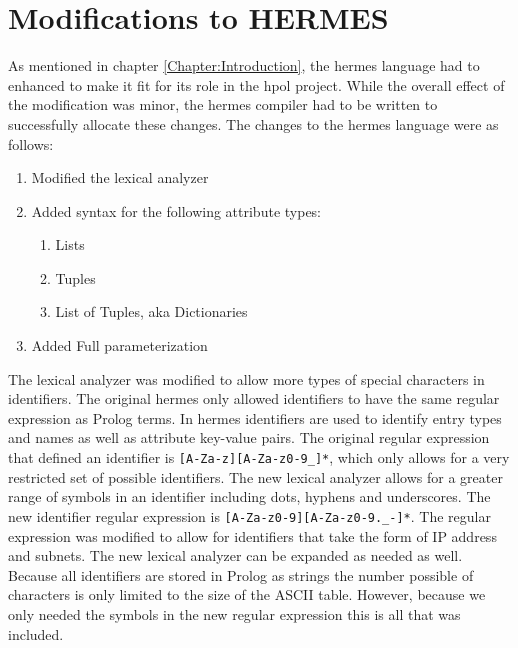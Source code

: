\documentclass[12pt,letterpaper]{report}
\begin{document}

\section{Modifications to HERMES}
As mentioned in chapter \ref{Chapter:Introduction}, the \ac{hermes} language had to enhanced to make it fit for its role in the \ac{hpol} project. While the overall effect of the modification was minor, the \ac{hermes} compiler had to be written to successfully allocate these changes. The changes to the \ac{hermes} language were as follows:
\begin{enumerate}
	\item Modified the lexical analyzer
	\item Added syntax for the following attribute types:
	\begin{enumerate}
		\item Lists
		\item Tuples
		\item List of Tuples, aka Dictionaries
	\end{enumerate}
	\item Added Full parameterization
\end{enumerate}

The lexical analyzer was modified to allow more types of special characters in identifiers. The original \ac{hermes} only allowed identifiers to have the same regular expression as Prolog terms. In \ac{hermes} identifiers are used to identify entry types and names as well as attribute key-value pairs. The original regular expression that defined an identifier is \verb|[A-Za-z][A-Za-z0-9_]*|, which only allows for a very restricted set of possible identifiers. The new lexical analyzer allows for a greater range of symbols in an identifier including dots, hyphens and underscores. The new identifier regular expression is \verb|[A-Za-z0-9][A-Za-z0-9._-]*|. The regular expression was modified to allow for identifiers that take the form of IP address and subnets. The new lexical analyzer can be expanded as needed as well. Because all identifiers are stored in Prolog as strings the number possible of characters is only limited to the size of the ASCII table. However, because we only needed the symbols in the new regular expression this is all that was included.
\end{document}
